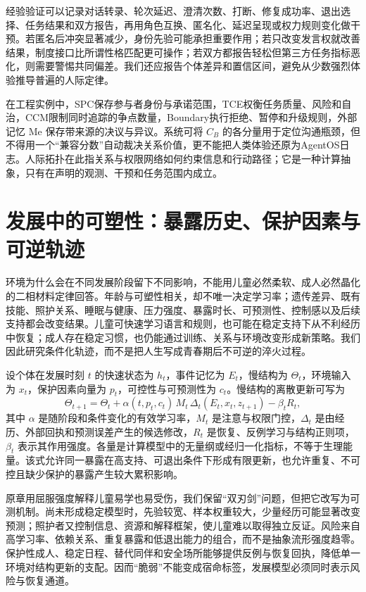 经验验证可以记录对话转录、轮次延迟、澄清次数、打断、修复成功率、退出选择、任务结果和双方报告，再用角色互换、匿名化、延迟呈现或权力规则变化做干预。若匿名后冲突显著减少，身份先验可能承担重要作用；若只改变发言权就改善结果，制度接口比所谓性格匹配更可操作；若双方都报告轻松但第三方任务指标恶化，则需要警惕共同偏差。我们还应报告个体差异和置信区间，避免从少数强烈体验推导普遍的人际定律。

在工程实例中，SPC保存参与者身份与承诺范围，TCE权衡任务质量、风险和自治，CCM限制同时追踪的争点数量，Boundary执行拒绝、暂停和升级规则，外部记忆 $\mathrm{Me}$ 保存带来源的决议与异议。系统可将 $C_B$ 的各分量用于定位沟通瓶颈，但不得用一个“兼容分数”自动裁决关系价值，更不能把人类体验还原为AgentOS日志。人际拓扑在此指关系与权限网络如何约束信息和行动路径；它是一种计算抽象，只有在声明的观测、干预和任务范围内成立。

\section{发展中的可塑性：暴露历史、保护因素与可逆轨迹}
\label{sec:manifold_ontogeny}
环境为什么会在不同发展阶段留下不同影响，不能用儿童必然柔软、成人必然晶化的二相材料定律回答。年龄与可塑性相关，却不唯一决定学习率；遗传差异、既有技能、照护关系、睡眠与健康、压力强度、暴露时长、可预测性、控制感以及后续支持都会改变结果。儿童可快速学习语言和规则，也可能在稳定支持下从不利经历中恢复；成人存在稳定习惯，也仍能通过训练、关系与环境改变形成新策略。我们因此研究条件化轨迹，而不是把人生写成青春期后不可逆的淬火过程。

设个体在发展时刻 $t$ 的快速状态为 $h_t$，事件记忆为 $E_t$，慢结构为 $\Theta_t$，环境输入为 $x_t$，保护因素向量为 $p_t$，可控性与可预测性为 $c_t$。慢结构的离散更新可写为
\[
\Theta_{t+1}=\Theta_t+\alpha(t,p_t,c_t)\,M_t\,\Delta_t(E_t,x_t,z_{t+1})-\beta_t R_t,
\]
其中 $\alpha$ 是随阶段和条件变化的有效学习率，$M_t$ 是注意与权限门控，$\Delta_t$ 是由经历、外部回执和预测误差产生的候选修改，$R_t$ 是恢复、反例学习与结构正则项，$\beta_t$ 表示其作用强度。各量是计算模型中的无量纲或经归一化指标，不等于生理能量。该式允许同一暴露在高支持、可退出条件下形成有限更新，也允许重复、不可控且缺少保护的暴露产生较大累积影响。

原章用屈服强度解释儿童易学也易受伤，我们保留“双刃剑”问题，但把它改写为可测机制。尚未形成稳定模型时，先验较宽、样本权重较大，少量经历可能显著改变预测；照护者又控制信息、资源和解释框架，使儿童难以取得独立反证。风险来自高学习率、依赖关系、重复暴露和低退出能力的组合，而不是抽象流形强度趋零。保护性成人、稳定日程、替代同伴和安全场所能够提供反例与恢复回执，降低单一环境对结构更新的支配。因而“脆弱”不能变成宿命标签，发展模型必须同时表示风险与恢复通道。

